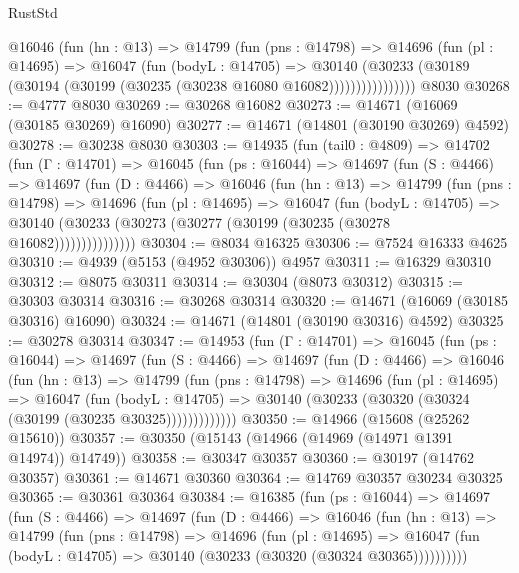 \begin{lexlean}{RustStd}
\begin{coremodule}
              @16046
                (fun (hn : @13) =>
                @14799
                  (fun (pns : @14798) =>
                  @14696
                    (fun (pl : @14695) =>
                    @16047
                      (fun (bodyL : @14705) =>
                      @30140
                        (@30233
                          (@30189 (@30194 (@30199 (@30235 (@30238 @16080 @16082))))))))))))))))
    @8030
@30268 := @4777 @8030
@30269 := @30268 @16082
@30273 := @14671 (@16069 (@30185 @30269) @16090)
@30277 := @14671 (@14801 (@30190 @30269) @4592)
@30278 := @30238 @8030
@30303 := @14935
    (fun (tail0 : @4809) =>
    @14702
      (fun (Γ : @14701) =>
      @16045
        (fun (ps : @16044) =>
        @14697
          (fun (S : @4466) =>
          @14697
            (fun (D : @4466) =>
            @16046
              (fun (hn : @13) =>
              @14799
                (fun (pns : @14798) =>
                @14696
                  (fun (pl : @14695) =>
                  @16047
                    (fun (bodyL : @14705) =>
                    @30140 (@30233 (@30273 (@30277 (@30199 (@30235 (@30278 @16082)))))))))))))))
@30304 := @8034 @16325
@30306 := @7524 @16333 @4625
@30310 := @4939 (@5153 (@4952 @30306)) @4957
@30311 := @16329 @30310
@30312 := @8075 @30311
@30314 := @30304 (@8073 @30312)
@30315 := @30303 @30314
@30316 := @30268 @30314
@30320 := @14671 (@16069 (@30185 @30316) @16090)
@30324 := @14671 (@14801 (@30190 @30316) @4592)
@30325 := @30278 @30314
@30347 := @14953
    (fun (Γ : @14701) =>
    @16045
      (fun (ps : @16044) =>
      @14697
        (fun (S : @4466) =>
        @14697
          (fun (D : @4466) =>
          @16046
            (fun (hn : @13) =>
            @14799
              (fun (pns : @14798) =>
              @14696
                (fun (pl : @14695) =>
                @16047
                  (fun (bodyL : @14705) =>
                  @30140 (@30233 (@30320 (@30324 (@30199 (@30235 @30325)))))))))))))
@30350 := @14966 (@15608 (@25262 @15610))
@30357 := @30350 (@15143 (@14966 (@14969 (@14971 @1391 @14974)) @14749))
@30358 := @30347 @30357
@30360 := @30197 (@14762 @30357)
@30361 := @14671 @30360
@30364 := @14769 @30357 @30234 @30325
@30365 := @30361 @30364
@30384 := @16385
    (fun (ps : @16044) =>
    @14697
      (fun (S : @4466) =>
      @14697
        (fun (D : @4466) =>
        @16046
          (fun (hn : @13) =>
          @14799
            (fun (pns : @14798) =>
            @14696
              (fun (pl : @14695) =>
              @16047 (fun (bodyL : @14705) => @30140 (@30233 (@30320 (@30324 @30365))))))))))

\end{coremodule}
\end{lexlean}
